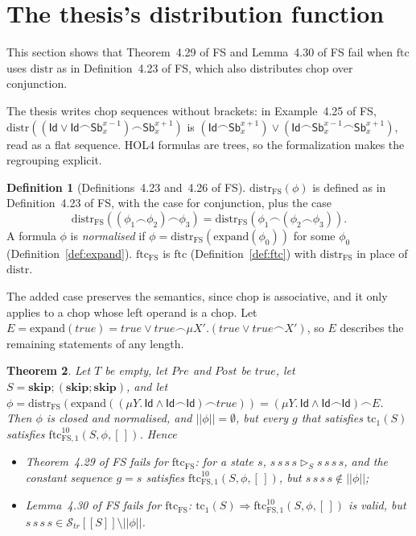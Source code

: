 \documentclass[11pt]{article}
\newcommand{\sem}[1]{[\![ #1 ]\!]}
\newcommand{\fsem}[1]{|\!|#1|\!|}
\newcommand{\Str}{{\mathcal{S}_{\mathit{tr}}}}
\newcommand{\chop}{\smallfrown}
\newcommand{\Id}{\mathsf{Id}}
\newcommand{\Sb}[2]{\mathsf{Sb}^{#1}_{#2}}
\newcommand{\kw}[1]{\mathbf{#1}}
\newcommand{\skipS}{\kw{skip}}
\newcommand{\Pre}{\mathit{Pre}}
\newcommand{\Post}{\mathit{Post}}
\newcommand{\tc}{\mathrm{tc}}
\newcommand{\ftc}{\mathrm{ftc}}
\newcommand{\distr}{\mathrm{distr}}
\newcommand{\eff}{\rhd}
\newcommand{\Th}[1]{#1 of FS}
\theoremstyle{plain}
\newtheorem{theorem}{Theorem}[section]
\theoremstyle{definition}
\newtheorem{definition}[theorem]{Definition}
\theoremstyle{remark}
\begin{document}
\section{The thesis's distribution function}\label{sec:distr-thesis}

This section shows that \Th{Theorem~4.29} and \Th{Lemma~4.30} fail when
$\ftc$ uses $\distr$ as in \Th{Definition~4.23}, which also distributes
chop over conjunction.

The thesis writes chop sequences without brackets: in \Th{Example~4.25},
$\distr((\Id \lor \Id\chop\Sb{x-1}{x})\chop\Sb{x+1}{x})$ is
$(\Id\chop\Sb{x+1}{x}) \lor (\Id\chop\Sb{x-1}{x}\chop\Sb{x+1}{x})$, read as
a flat sequence. HOL4 formulas are trees, so the formalization makes the
regrouping explicit.

\begin{definition}[\Th{Definitions~4.23 and~4.26}]
  \label{def:distr-thesis}
  $\distr_{\mathrm{FS}}(\phi)$ is defined as
  in \Th{Definition~4.23}, with the case for conjunction, plus the case
  \[
    \distr_{\mathrm{FS}}((\phi_1\chop\phi_2)\chop\phi_3) =
    \distr_{\mathrm{FS}}(\phi_1\chop(\phi_2\chop\phi_3)).
  \]
  A formula $\phi$ is \emph{normalised} if $\phi =
  \distr_{\mathrm{FS}}(\mathrm{expand}(\phi_0))$ for some $\phi_0$
  (Definition~\ref{def:expand}).
  $\ftc_{\mathrm{FS}}$ is $\ftc$ (Definition~\ref{def:ftc}) with
  $\distr_{\mathrm{FS}}$ in place of $\distr$.
\end{definition}

The added case preserves the semantics, since chop is associative, and it
only applies to a chop whose left operand is a chop. Let
$E = \mathrm{expand}(\mathit{true}) = \mathit{true} \lor
\mathit{true}\chop\mu X'.(\mathit{true} \lor \mathit{true}\chop X')$, so
$E$ describes the remaining statements of any length.

\begin{theorem}\label{thm:ftc-thesis}
  Let $T$ be empty, let $\Pre$ and $\Post$ be $\mathit{true}$, let
  $S = \skipS; (\skipS; \skipS)$, and let
  $\phi = \distr_{\mathrm{FS}}(\mathrm{expand}((\mu Y.\,\Id \land
  \Id\chop\Id)\chop\mathit{true})) = (\mu Y.\,\Id \land \Id\chop\Id)\chop E$.
  Then $\phi$ is closed and normalised, and $\fsem{\phi} = \emptyset$, but
  every $g$ that satisfies $\tc_1(S)$ satisfies
  $\ftc_{\mathrm{FS},1}^{10}(S, \phi, [\,])$. Hence
  \begin{itemize}
  \item \Th{Theorem~4.29} fails for $\ftc_{\mathrm{FS}}$: for a state $s$,
    $s\,s\,s\,s \eff_S s\,s\,s\,s$, and the constant sequence $g = s$
    satisfies $\ftc_{\mathrm{FS},1}^{10}(S, \phi, [\,])$, but
    $s\,s\,s\,s \notin \fsem{\phi}$;
  \item \Th{Lemma~4.30} fails for $\ftc_{\mathrm{FS}}$:
    $\tc_1(S) \Rightarrow \ftc_{\mathrm{FS},1}^{10}(S, \phi, [\,])$ is
    valid, but $s\,s\,s\,s \in \Str\sem{S} \setminus \fsem{\phi}$.
  \end{itemize}
\end{theorem}
\end{document}

